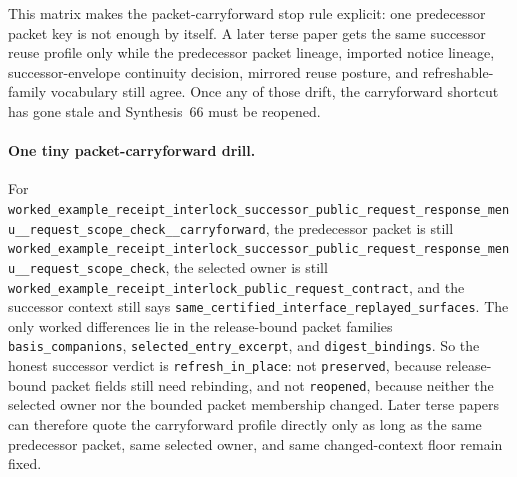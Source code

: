 \documentclass[11pt]{article}
\begin{document}
This matrix makes the packet-carryforward stop rule explicit: one predecessor packet key is not enough by itself. A later terse paper gets the same successor reuse profile only while the predecessor packet lineage, imported notice lineage, successor-envelope continuity decision, mirrored reuse posture, and refreshable-family vocabulary still agree. Once any of those drift, the carryforward shortcut has gone stale and Synthesis~66 must be reopened.\cite{series:workedexample}

\paragraph{One tiny packet-carryforward drill.}
For \nolinkurl{worked_example_receipt_interlock_successor_public_request_response_menu__request_scope_check__carryforward}, the predecessor packet is still \nolinkurl{worked_example_receipt_interlock_successor_public_request_response_menu__request_scope_check}, the selected owner is still \nolinkurl{worked_example_receipt_interlock_public_request_contract}, and the successor context still says \nolinkurl{same_certified_interface_replayed_surfaces}. The only worked differences lie in the release-bound packet families \nolinkurl{basis_companions}, \nolinkurl{selected_entry_excerpt}, and \nolinkurl{digest_bindings}. So the honest successor verdict is \nolinkurl{refresh_in_place}: not \nolinkurl{preserved}, because release-bound packet fields still need rebinding, and not \nolinkurl{reopened}, because neither the selected owner nor the bounded packet membership changed. Later terse papers can therefore quote the carryforward profile directly only as long as the same predecessor packet, same selected owner, and same changed-context floor remain fixed.\cite{series:workedexample}
\end{document}
